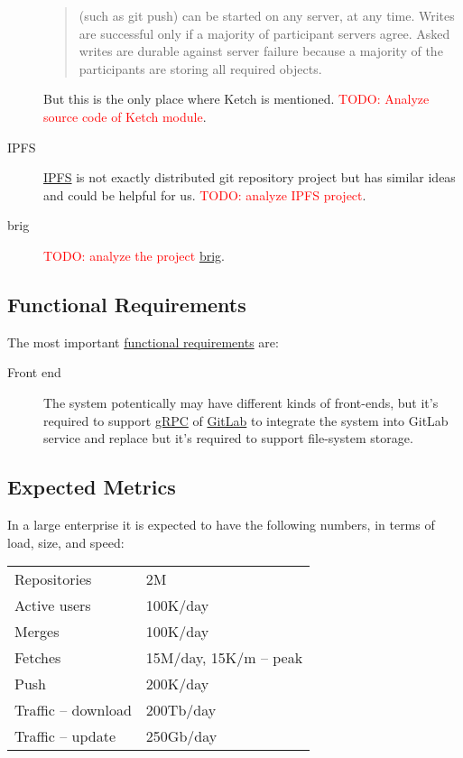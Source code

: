 \documentclass[acmlarge, screen, nonacm, 11pt]{acmart}
\newcommand{\todo}[1]{\textcolor{red}{TODO: #1}}
\begin{document}
\begin{description}
\begin{quote}
      (such as git push) can be started on any server, at any time. Writes
      are successful only if a majority of participant servers agree.
      Asked writes are durable against server failure because a majority of
      the participants are storing all required objects.
    \end{quote}
    But this is the only place where Ketch is mentioned. \todo{Analyze source code of Ketch module}.
  \item[IPFS]
    \href{https://ipfs.io/}{IPFS} is not exactly distributed git repository project but has similar ideas
    and could be helpful for us. \todo{analyze IPFS project}.
  \item[brig]
    \todo{analyze the project} \href{https://github.com/sahib/brig}{brig}.
\end{description}

\subsection{Functional Requirements}\label{sec:fr}

The most important \href{https://en.wikipedia.org/wiki/Functional_requirement}{functional requirements} are:

\begin{description}
  \item[Front end]
    The system potentically may have different kinds of front-ends,
    but it's required to support \href{https://grpc.io/}{gRPC}
    of \href{https://about.gitlab.com/}{GitLab} to integrate the system
    into GitLab service and replace
    but it's required to support file-system storage.
\end{description}

\subsection{Expected Metrics}\label{ref:metrics}

In a large enterprise it is expected to have the following
numbers, in terms of load, size, and speed:

\begin{tabular}{ll}
  Repositories & 2M \\
  Active users & 100K/day \\
  Merges & 100K/day \\
  Fetches & 15M/day, 15K/m -- peak \\
  Push & 200K/day \\
  Traffic -- download & 200Tb/day \\
  Traffic -- update & 250Gb/day \\
\end{tabular}
\end{document}
